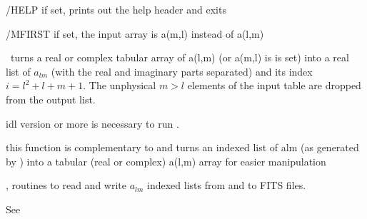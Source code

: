 \begin{keywords}
  \begin{kwlist}{} %
    \item[/HELP] %
	if set, prints out the help header and exits
    \item[/MFIRST] %
 if set, the input array is a(m,l) instead of a(l,m)
  \end{kwlist}
\end{keywords}  

\begin{codedescription}
{%
\thedocid\ turns a real or complex tabular array of a(l,m) (or a(m,l) is  is
set) into a real list of $a_{lm}$ (with the real and imaginary parts separated)
and its index $i=l^2+l+m+1$. The unphysical $m>l$ elements of the input
table are dropped from the output list.
}
\end{codedescription}



\begin{related}
  \begin{sulist}{} %
    \item[idl] version \idlversion or more is necessary to run \thedocid.
    \item[\htmlref{alm\_i2t}{idl:alm_i2t}] this function is complementary to
\thedocid and
turns an indexed list of alm (as generated by
) into a tabular (real or complex) a(l,m) array
for easier manipulation
  \item[\htmlref{alm2fits}{idl:alm2fits}, \htmlref{fits2alm}{idl:fits2alm}]
routines to read and write $a_{lm}$ indexed lists from and to FITS files.
  \end{sulist}
\end{related}

\begin{example}
{%
}%
{%
See 
}
\end{example}


